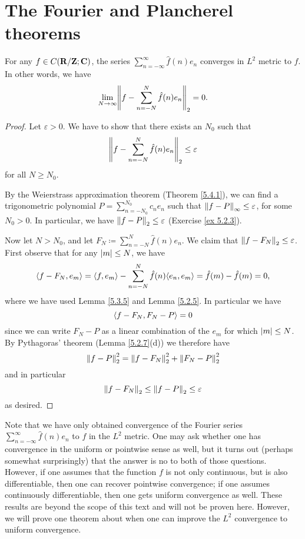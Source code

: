 \section{The Fourier and Plancherel theorems}\label{sec 5.5}

\begin{theorem}\label{5.5.1}
    For any \(f \in C(\R / \Z ; \C)\), the series \(\sum_{n = -\infty}^\infty \hat{f}(n) e_n\) converges in \(L^2\) metric to \(f\).
    In other words, we have
    \[
        \lim_{N \to \infty} \norm*{f - \sum_{n = -N}^N \hat{f}(n) e_n}_2 = 0.
    \]
\end{theorem}

\begin{proof}
    Let \(\varepsilon > 0\).
    We have to show that there exists an \(N_0\) such that
    \[
        \norm*{f - \sum_{n = -N}^N \hat{f}(n) e_n}_2 \leq \varepsilon
    \]
    for all \(N \geq N_0\).

    By the Weierstrass approximation theorem (Theorem \ref{5.4.1}), we can find a trigonometric polynomial \(P = \sum_{n = -N_0}^{N_0} c_n e_n\) such that \(\norm*{f - P}_{\infty} \leq \varepsilon\), for some \(N_0 > 0\).
    In particular, we have \(\norm*{f - P}_2 \leq \varepsilon\) (Exercise \ref{ex 5.2.3}).

    Now let \(N > N_0\), and let \(F_N \coloneqq \sum_{n = -N}^N \hat{f}(n) e_n\).
    We claim that \(\norm*{f - F_N}_2 \leq \varepsilon\).
    First observe that for any \(\abs{m} \leq N\), we have
    \[
        \inner*{f - F_N, e_m} = \inner*{f, e_m} - \sum_{n = -N}^N \hat{f}(n) \inner*{e_n, e_m} = \hat{f}(m) - \hat{f}(m) = 0,
    \]
    where we have used Lemma \ref{5.3.5} and Lemma \ref{5.2.5}.
    In particular we have
    \[
        \inner*{f - F_N, F_N - P} = 0
    \]
    since we can write \(F_N - P\) as a linear combination of the \(e_m\) for which \(\abs{m} \leq N\).
    By Pythagoras' theorem (Lemma \ref{5.2.7}(d)) we therefore have
    \[
        \norm*{f - P}_2^2 = \norm*{f - F_N}_2^2 + \norm*{F_N - P}_2^2
    \]
    and in particular
    \[
        \norm*{f - F_N}_2 \leq \norm*{f - P}_2 \leq \varepsilon
    \]
    as desired.
\end{proof}

\begin{remark}\label{5.5.2}
    Note that we have only obtained convergence of the Fourier series \(\sum_{n = -\infty}^\infty \hat{f}(n) e_n\) to \(f\) in the \(L^2\) metric.
    One may ask whether one has convergence in the uniform or pointwise sense as well, but it turns out (perhaps somewhat surprisingly) that the answer is no to both of those questions.
    However, if one assumes that the function \(f\) is not only continuous, but is also differentiable, then one can recover pointwise convergence;
    if one assumes continuously differentiable, then one gets uniform convergence as well.
    These results are beyond the scope of this text and will not be proven here.
    However, we will prove one theorem about when one can improve the \(L^2\) convergence to uniform convergence.
\end{remark}

